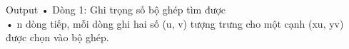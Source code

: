 Output
• Dòng 1: Ghi trọng số bộ ghép tìm được   
\\   • n dòng tiếp, mỗi dòng ghi hai số (u, v) tượng trưng cho một cạnh (xu, yv) được chọn vào bộ ghép.